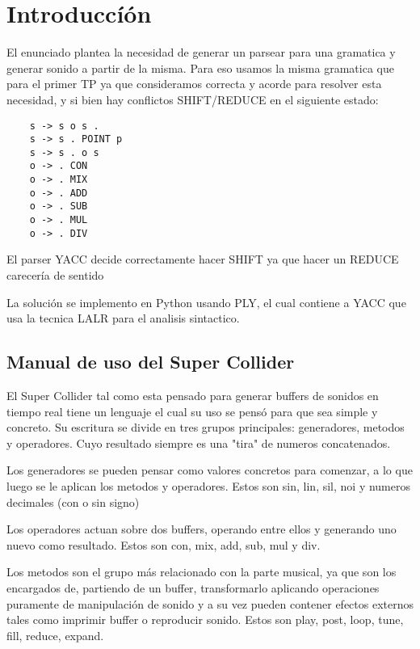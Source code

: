 \documentclass[a4paper,titlepage,10pt]{article}
\begin{document}

\maketitle

\section{Introduccíón}


El enunciado plantea la necesidad de generar un parsear para una gramatica y generar sonido a partir de la misma. Para eso usamos la misma gramatica que para el primer TP ya que consideramos correcta y acorde para resolver esta necesidad, y si bien hay conflictos  SHIFT/REDUCE en el siguiente estado:

\begin{verbatim}
    s -> s o s .
    s -> s . POINT p
    s -> s . o s
    o -> . CON
    o -> . MIX
    o -> . ADD
    o -> . SUB
    o -> . MUL
    o -> . DIV
\end{verbatim}

El parser YACC decide correctamente hacer SHIFT ya que hacer un REDUCE carecería de sentido

La solución se implemento en Python usando PLY, el cual contiene a YACC que usa la tecnica LALR para el analisis sintactico.

\subsection{Manual de uso del Super Collider}
El Super Collider tal como esta pensado para generar buffers de sonidos en tiempo real tiene un lenguaje el cual su uso se pensó para que sea simple y concreto. Su escritura se divide en tres grupos principales: generadores, metodos y operadores. Cuyo resultado siempre es una "tira" de numeros concatenados.  

Los generadores se pueden pensar como valores concretos para comenzar, a lo que luego se le aplican los metodos y operadores. Estos son sin, lin, sil, noi y numeros decimales (con o sin signo)

Los operadores actuan sobre dos buffers, operando entre ellos y generando uno nuevo como resultado. Estos son con, mix, add, sub, mul y div.

Los metodos son el grupo más relacionado con la parte musical, ya que son los encargados de, partiendo de un buffer, transformarlo aplicando operaciones puramente de manipulación de sonido y a su vez pueden contener efectos externos tales como imprimir buffer o reproducir sonido. Estos son play, post, loop, tune, fill, reduce, expand.
\end{document}
